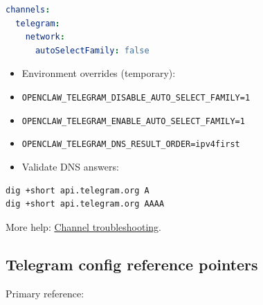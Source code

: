 \begin{lstlisting}[language=yaml]
channels:
  telegram:
    network:
      autoSelectFamily: false
\end{lstlisting}


\begin{itemize}
  \item Environment overrides (temporary):
  \item \texttt{OPENCLAW\_TELEGRAM\_DISABLE\_AUTO\_SELECT\_FAMILY=1}
  \item \texttt{OPENCLAW\_TELEGRAM\_ENABLE\_AUTO\_SELECT\_FAMILY=1}
  \item \texttt{OPENCLAW\_TELEGRAM\_DNS\_RESULT\_ORDER=ipv4first}
  \item Validate DNS answers:
\end{itemize}


\begin{lstlisting}[language=bash]
dig +short api.telegram.org A
dig +short api.telegram.org AAAA
\end{lstlisting}



More help: \href{/channels/troubleshooting}{Channel troubleshooting}.

\subsection{Telegram config reference pointers}


Primary reference:

